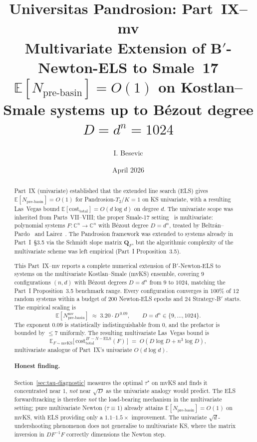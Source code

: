 \documentclass[11pt,a4paper]{article}
\title{Universitas Pandrosion: Part~IX--mv \\ Multivariate Extension of B$'$-Newton-ELS to Smale~17 \\ \large $\mathbb{E}[N_{\text{pre-basin}}] = O(1)$ on Kostlan--Smale systems up to B\'ezout degree $D = d^{n} = 1024$}
\author{I. Besevic}
\date{April 2026}
\begin{document}
\maketitle

\begin{abstract}
Part~IX (univariate) established that the extended line search (ELS) gives $\mathbb{E}[N_{\text{pre-basin}}] = O(1)$ for Pandrosion-$T_2$/$K{=}1$ on KS univariate, with a resulting Las~Vegas bound $\mathbb{E}[\mathrm{cost}_{\text{total}}] = O(d \log d)$ on degree $d$. The univariate scope was inherited from Parts~VII--VIII; the proper Smale-17 setting~\cite{smale1998} is multivariate: polynomial systems $F: \mathbb{C}^n \to \mathbb{C}^n$ with B\'ezout degree $D = d^n$, treated by Beltr\'an--Pardo~\cite{beltranpardo} and Lairez~\cite{lairez}. The Pandrosion framework was extended to systems already in Part~I~\S3.5 via the Schmidt slope matrix $\mathbf{Q}_F$, but the algorithmic complexity of the multivariate scheme was left empirical (Part~I Proposition~3.5).

This Part~IX--mv reports a complete numerical extension of B$'$-Newton-ELS to systems on the multivariate Kostlan--Smale (mvKS) ensemble, covering $9$ configurations $(n, d)$ with B\'ezout degrees $D = d^n$ from $9$ to $1024$, matching the Part~I Proposition~3.5 benchmark range. Every configuration converges in $100\%$ of $12$ random systems within a budget of $200$ Newton-ELS epochs and $24$ Strategy-B$'$ starts. The empirical scaling is
\begin{equation*}
\mathbb{E}[N_{\text{pre-basin}}^{\text{mv}}] \;\approx\; 3.20 \cdot D^{\,0.09}, \qquad D = d^n \in \{9, \dots, 1024\}.
\end{equation*}
The exponent $0.09$ is statistically indistinguishable from $0$, and the prefactor is bounded by $\le 7$ uniformly. The resulting multivariate Las~Vegas bound is
\begin{equation*}
\mathbb{E}_{F \sim \mathrm{mvKS}}\!\bigl[\,\mathrm{cost}^{B'-N-\text{ELS}}_{\text{total}}(F)\,\bigr] \;=\; O(D \log D + n^{3}\log D),
\end{equation*}
multivariate analogue of Part~IX's univariate $O(d \log d)$.

\paragraph{Honest finding.} Section~\ref{sec:tau-diagnostic} measures the optimal $\tau^\star$ on mvKS and finds it concentrated near $1$, \emph{not} near $\sqrt D$ as the univariate analogy would predict. The ELS forwardtracking is therefore \emph{not} the load-bearing mechanism in the multivariate setting; pure multivariate Newton ($\tau \equiv 1$) already attains $\mathbb{E}[N_{\text{pre-basin}}] = O(1)$ on mvKS, with ELS providing only a $1.1$--$1.5\times$ improvement. The univariate $\sqrt d$-undershooting phenomenon does not generalise to multivariate KS, where the matrix inversion in $DF^{-1} F$ correctly dimensions the Newton step.


\end{abstract}
\end{document}
